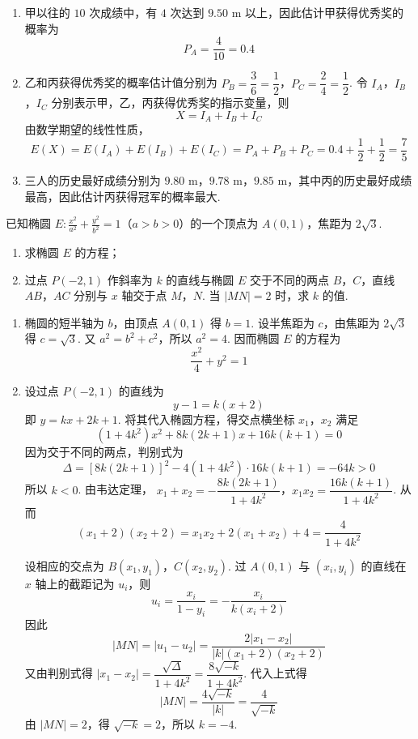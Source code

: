 \begin{solution}
\begin{enumerate}
\item 甲以往的 \(10\) 次成绩中，有 \(4\) 次达到 \(9.50\text{ m}\) 以上，因此估计甲获得优秀奖的概率为
\[
P_A=\dfrac{4}{10}=0.4
\]

\item 乙和丙获得优秀奖的概率估计值分别为
\(P_B=\dfrac{3}{6}=\dfrac12\)，\(P_C=\dfrac{2}{4}=\dfrac12\).
令 \(I_A\)，\(I_B\)，\(I_C\) 分别表示甲，乙，丙获得优秀奖的指示变量，则
\[
X=I_A+I_B+I_C
\]
由数学期望的线性性质，
\[
E(X)=E(I_A)+E(I_B)+E(I_C)=P_A+P_B+P_C
=0.4+\dfrac12+\dfrac12=\dfrac75
\]

\item 三人的历史最好成绩分别为 \(9.80\text{ m}\)，\(9.78\text{ m}\)，\(9.85\text{ m}\)，其中丙的历史最好成绩最高，因此估计丙获得冠军的概率最大.
\end{enumerate}
\end{solution}

\begin{problem}
已知椭圆 \(E:\frac{x^2}{a^2}+\frac{y^2}{b^2}=1\)（\(a>b>0\)）的一个顶点为 \(A(0,1)\)，焦距为 \(2\sqrt3\).

\begin{enumerate}
\item 求椭圆 \(E\) 的方程；

\item 过点 \(P(-2,1)\) 作斜率为 \(k\) 的直线与椭圆 \(E\) 交于不同的两点 \(B\)，\(C\)，直线 \(AB\)，\(AC\) 分别与 \(x\) 轴交于点 \(M\)，\(N\). 当 \(|MN|=2\) 时，求 \(k\) 的值.
\end{enumerate}
\end{problem}

\begin{solution}
\begin{enumerate}
\item 椭圆的短半轴为 \(b\)，由顶点 \(A(0,1)\) 得 \(b=1\). 设半焦距为 \(c\)，由焦距为 \(2\sqrt3\) 得 \(c=\sqrt3\). 又 \(a^2=b^2+c^2\)，所以 \(a^2=4\). 因而椭圆 \(E\) 的方程为
\[
\dfrac{x^2}{4}+y^2=1
\]

\item 设过点 \(P(-2,1)\) 的直线为
\[
y-1=k(x+2)
\]
即 \(y=kx+2k+1\). 将其代入椭圆方程，得交点横坐标 \(x_1\)，\(x_2\) 满足
\[
(1+4k^2)x^2+8k(2k+1)x+16k(k+1)=0
\]
因为交于不同的两点，判别式为
\[
\Delta=\left[8k(2k+1)\right]^2-4(1+4k^2)\cdot16k(k+1)=-64k>0
\]
所以 \(k<0\). 由韦达定理，
\(x_1+x_2=-\dfrac{8k(2k+1)}{1+4k^2}\)，\(x_1x_2=\dfrac{16k(k+1)}{1+4k^2}\).
从而
\[
(x_1+2)(x_2+2)=x_1x_2+2(x_1+x_2)+4=\dfrac{4}{1+4k^2}
\]

设相应的交点为 \(B(x_1,y_1)\)，\(C(x_2,y_2)\). 过 \(A(0,1)\) 与 \((x_i,y_i)\) 的直线在 \(x\) 轴上的截距记为 \(u_i\)，则
\[
u_i=\dfrac{x_i}{1-y_i}=-\dfrac{x_i}{k(x_i+2)}
\]
因此
\[
|MN|=|u_1-u_2|=\dfrac{2|x_1-x_2|}{|k|(x_1+2)(x_2+2)}
\]
又由判别式得 \(|x_1-x_2|=\dfrac{\sqrt{\Delta}}{1+4k^2}=\dfrac{8\sqrt{-k}}{1+4k^2}\). 代入上式得
\[
|MN|=\dfrac{4\sqrt{-k}}{|k|}=\dfrac{4}{\sqrt{-k}}
\]
由 \(|MN|=2\)，得 \(\sqrt{-k}=2\)，所以 \(k=-4\).
\end{enumerate}
\end{solution}

